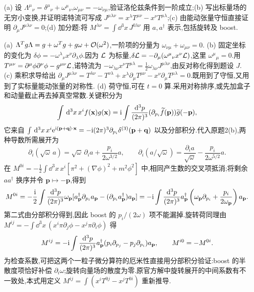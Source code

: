 \begin{exercise}
(a) 设 $\Lambda^\mu{}_\nu=\delta^\mu{}_\nu+\omega^\mu{}_\nu$,$\omega_{\mu\nu}=-\omega_{\nu\mu}$,验证洛伦兹条件到一阶成立;(b) 写出标量场的无穷小变换,并证明诺特流可写成 $J^{\mu\lambda\nu}=x^\lambda T^{\mu\nu}-x^\nu T^{\mu\lambda}$;(c) 由能动张量守恒直接证明 $\partial_\mu J^{\mu\lambda\nu}=0$;(d) 加分题:将 $M^{\lambda\nu}=\int\dd^3x\,J^{0\lambda\nu}$ 用 $a,a^\dagger$ 表示,包括旋转及 boost.
\end{exercise}
\begin{solution}
(a) $\Lambda^Tg\Lambda=g+\omega^Tg+g\omega+\mathcal O(\omega^2)$,一阶项的分量为 $\omega_{\nu\mu}+\omega_{\mu\nu}=0$.
(b) 固定坐标的变化为 $\delta\phi=-\omega^\lambda{}_\nu x^\nu\partial_\lambda\phi$.因为 $\mathcal L$ 为标量,$\delta\mathcal L=-\partial_\mu(\omega^\mu{}_\nu x^\nu\mathcal L)$,这里 $\omega^\mu{}_\mu=0$.用 $T^{\mu\nu}=\partial^\mu\phi\partial^\nu\phi-g^{\mu\nu}\mathcal L$,诺特流为
$-\omega_{\lambda\nu}x^\nu T^{\mu\lambda}=\tfrac12\omega_{\lambda\nu}J^{\mu\lambda\nu}$,由反对称化得到题设 $J$.
(c) 乘积求导给出
$\partial_\mu J^{\mu\lambda\nu}=T^{\lambda\nu}-T^{\nu\lambda}+x^\lambda\partial_\mu T^{\mu\nu}-x^\nu\partial_\mu T^{\mu\lambda}=0$.既用到了守恒,又用到了实标量能动张量的对称性.
(d) 荷守恒,可在 $t=0$ 算.采用对称排序,或先加盒子和动量截止再去掉真空常数.关键积分为
\[
\int\,\mathrm d^3x\,x^i f(\mathbf x)g(\mathbf x)
=\mathrm i\int\frac{\mathrm d^3p}{(2\pi)^3}(\partial_{p_i}\widetilde f(\mathbf p))\widetilde g(-\mathbf p),
\]
它来自 $\int\,\mathrm d^3x\,x^i\mathrm e^{\mathrm i(\mathbf p+\mathbf q)\cdot\mathbf x}=-\mathrm i(2\pi)^3\partial_{p_i}\delta^{(3)}(\mathbf p+\mathbf q)$ 以及分部积分.代入原题2(b),两种导数所需展开为
\[
\partial_i(\sqrt\omega\,a)=\sqrt\omega\,\partial_i a+\frac{p_i}{2\omega^{3/2}}a,\qquad
\partial_i(a/\sqrt\omega)=\frac{\partial_i a}{\sqrt\omega}-\frac{p_i}{2\omega^{5/2}}a.
\]
在 $M^{0i}=-\tfrac12\int\dd^3x\,x^i[\pi^2+(\nabla\phi)^2+m^2\phi^2]$ 中,相同产生数的交叉项抵消;将剩余 $a a^\dagger$ 换序并令 $\mathbf p\mapsto-\mathbf p$,得到
\[
M^{0i}=-\frac{\mathrm i}{2}\int\frac{\mathrm d^3p}{(2\pi)^3}\omega_{\mathbf p}
[a^\dagger_{\mathbf p}\partial_{p_i}a_{\mathbf p}-(\partial_{p_i}a^\dagger_{\mathbf p})a_{\mathbf p}]
=-\mathrm i\int\frac{\mathrm d^3p}{(2\pi)^3} a^\dagger_{\mathbf p}\left(\omega_{\mathbf p}\partial_{p_i}+\frac{p_i}{2\omega_{\mathbf p}}\right)a_{\mathbf p}.
\]
第二式由分部积分得到,因此 boost 的 $p_i/(2\omega)$ 项不能漏掉.旋转荷同理由
$M^{ij}=-\int\dd^3x\,(x^i\pi\partial_j\phi-x^j\pi\partial_i\phi)$ 得
\[
M^{ij}=-\mathrm i\int\frac{\mathrm d^3p}{(2\pi)^3} a^\dagger_{\mathbf p}(p_i\partial_{p_j}-p_j\partial_{p_i})a_{\mathbf p},\qquad M^{i0}=-M^{0i}.
\]
为检查系数,可把这两个一粒子微分算符的厄米性直接用分部积分验证:boost 的半散度项恰好补偿 $\partial_i\omega$;旋转向量场的散度为零.原官方解中旋转展开的中间系数有不一致处,本式用定义 $M^{ij}=\int(x^iT^{0j}-x^jT^{0i})$ 重新推导.
\end{solution}
